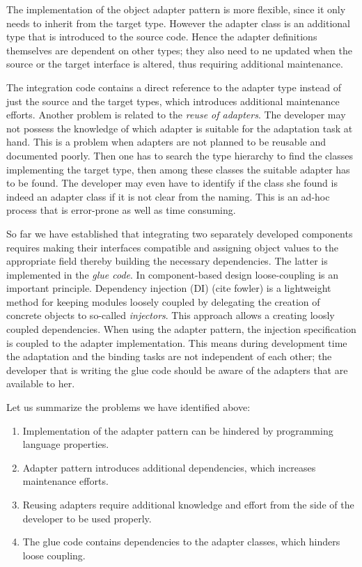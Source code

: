 The implementation of the object adapter pattern is more flexible, since it only needs to inherit from the target type. 
However the adapter class is an additional type that is introduced to the source code. 
Hence the adapter definitions themselves are dependent on other types; they also need to ne updated when the source or the target interface is altered, thus requiring additional maintenance.
 
The integration code contains a direct reference to the adapter type instead of just the source and the target types, which introduces additional maintenance efforts. 
Another problem is related to the \emph{reuse of adapters}.
The developer may not possess the knowledge of which adapter is suitable for the adaptation task at hand.
This is a problem when adapters are not planned to be reusable and documented poorly. 
Then one has to search the type hierarchy to find the classes implementing the target type, then among these classes the suitable adapter has to be found. 
The developer may even have to identify if the class she found is indeed an adapter class if it is not clear from the naming.
This is an ad-hoc process that is error-prone as well as time consuming.


So far we have established that integrating two separately developed components requires making their interfaces compatible and assigning object values to the appropriate field thereby building the necessary dependencies.
The latter is implemented in the \emph{glue code}.
In component-based design loose-coupling is an important principle.  
Dependency injection (DI) (cite fowler) is a lightweight method for keeping modules loosely coupled by delegating the creation of concrete objects to so-called \emph{injectors}. 
This approach allows a creating loosly coupled dependencies. 
When using the adapter pattern, the injection specification is coupled to the adapter implementation.
This means during development time the adaptation and the binding tasks are not independent of each other; the developer that is writing the glue code should be aware of the adapters that are available to her.

Let us summarize the problems we have identified above:
\begin{enumerate}[{P}-1]
\item Implementation of the adapter pattern can be hindered by programming language properties.
\item Adapter pattern introduces additional dependencies, which increases maintenance efforts.
\item Reusing adapters require additional knowledge and effort from the side of the developer to be used properly.
\item The glue code contains dependencies to the adapter classes, which hinders loose coupling.
\end{enumerate}


